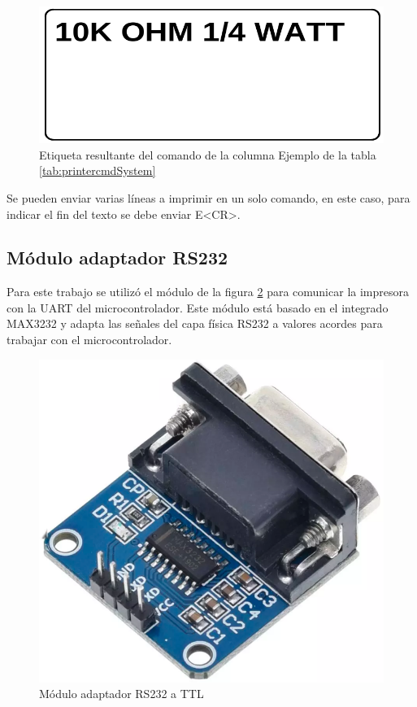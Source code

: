 \begin{figure}[htpb]
	\centering
	\includegraphics[scale=0.3]{./Figures/label_ej.png}
	\caption{Etiqueta resultante del comando de la columna Ejemplo de la tabla \ref{tab:printercmdSystem}}
	\label{fig:label_ej}
\end{figure}

Se pueden enviar varias líneas a imprimir en un solo comando, en este caso, para indicar el fin del texto se debe enviar E\textless{}CR\textgreater.

\subsection{Módulo adaptador RS232}
Para este trabajo se utilizó el módulo de la figura \ref{fig:rs232} para comunicar la impresora con la UART del microcontrolador. Este módulo está basado en el integrado MAX3232 \citep{MAX3232} y adapta las señales del capa física RS232 a valores acordes para trabajar con el microcontrolador.

\begin{figure}[htpb]
	\centering
	\includegraphics[scale=0.3]{./Figures/rs3232.png}
	\caption{Módulo adaptador RS232 a TTL}
	\label{fig:rs232}
\end{figure}


